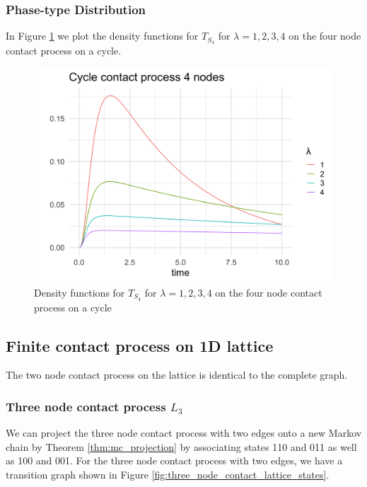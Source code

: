 \documentclass{article}
\theoremstyle{plain}
\theoremstyle{definition}
\theoremstyle{remark}
\numberwithin{equation}{section}
\begin{document}
\subsubsection{Phase-type Distribution}

In Figure \ref{fig:contact_4_cycle_phase_densities} we plot the density functions for $T_{S_4}$ for $\lambda = 1, 2, 3, 4$ on the four node contact process on a cycle.

\begin{figure}[H]
  \centering
    \includegraphics[width=.80\textwidth]{figures/cycle_4_contact_phase_densities.png}
   \caption{Density functions for $T_{S_4}$ for $\lambda = 1, 2, 3, 4$ on the four node contact process on a cycle}
  \label{fig:contact_4_cycle_phase_densities}
\end{figure}

\subsection{Finite contact process on 1D lattice}

The two node contact process on the lattice is identical to the complete graph.

\subsubsection{Three node contact process \texorpdfstring{$L_3$}{L3}}
We can project the three node contact process with two edges onto a new Markov chain by Theorem \ref{thm:mc_projection} by associating states 110 and 011 as well as 100 and 001.
For the three node contact process with two edges, we have a transition graph shown in Figure \ref{fig:three_node_contact_lattice_states}.
\end{document}
